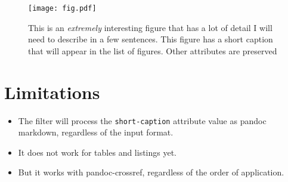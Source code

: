 \documentclass[
]{article}
\providecommand{\tightlist}{%
  \setlength{\itemsep}{0pt}\setlength{\parskip}{0pt}}
\begin{document}
\begin{figure}
\hypertarget{fig:shortcap}{%
\centering
\texttt{[image: fig.pdf]}
\caption[{A short caption with math \(x^n + y^n = z^n\)}]{This is an
\emph{extremely} interesting figure that has a lot of detail I will need
to describe in a few sentences. This figure has a short caption that
will appear in the list of figures. Other attributes are
preserved}\label{fig:shortcap}
}
\end{figure}

\hypertarget{limitations}{%
\section{Limitations}\label{limitations}}

\begin{itemize}
\tightlist
\item
  The filter will process the \texttt{short-caption} attribute value as
  pandoc markdown, regardless of the input format.
\item
  It does not work for tables and listings yet.
\item
  But it works with pandoc-crossref, regardless of the order of
  application.
\end{itemize}
\end{document}
